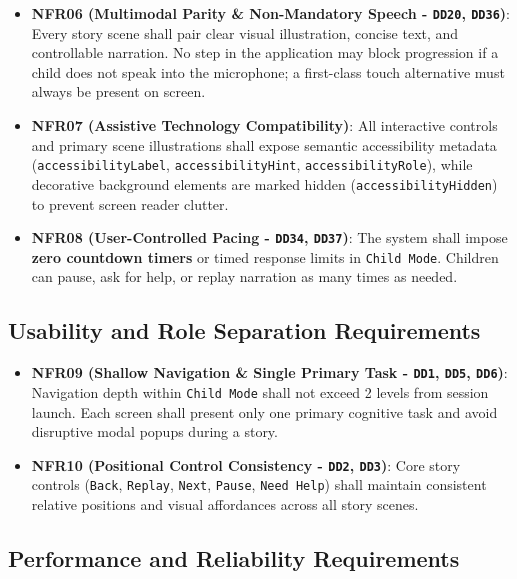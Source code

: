 \begin{itemize}
  \item \textbf{NFR06 (Multimodal Parity \& Non-Mandatory Speech - \texttt{DD20}, \texttt{DD36})}: Every story scene shall pair clear visual illustration, concise text, and controllable narration. No step in the application may block progression if a child does not speak into the microphone; a first-class touch alternative must always be present on screen.
  \item \textbf{NFR07 (Assistive Technology Compatibility)}: All interactive controls and primary scene illustrations shall expose semantic accessibility metadata (\texttt{accessibilityLabel}, \texttt{accessibilityHint}, \texttt{accessibilityRole}), while decorative background elements are marked hidden (\texttt{accessibilityHidden}) to prevent screen reader clutter.
  \item \textbf{NFR08 (User-Controlled Pacing - \texttt{DD34}, \texttt{DD37})}: The system shall impose \textbf{zero countdown timers} or timed response limits in \texttt{Child Mode}. Children can pause, ask for help, or replay narration as many times as needed.
\end{itemize}



\subsection{Usability and Role Separation Requirements}


\begin{itemize}
  \item \textbf{NFR09 (Shallow Navigation \& Single Primary Task - \texttt{DD1}, \texttt{DD5}, \texttt{DD6})}: Navigation depth within \texttt{Child Mode} shall not exceed 2 levels from session launch. Each screen shall present only one primary cognitive task and avoid disruptive modal popups during a story.
  \item \textbf{NFR10 (Positional Control Consistency - \texttt{DD2}, \texttt{DD3})}: Core story controls (\texttt{Back}, \texttt{Replay}, \texttt{Next}, \texttt{Pause}, \texttt{Need Help}) shall maintain consistent relative positions and visual affordances across all story scenes.
\end{itemize}



\subsection{Performance and Reliability Requirements}



